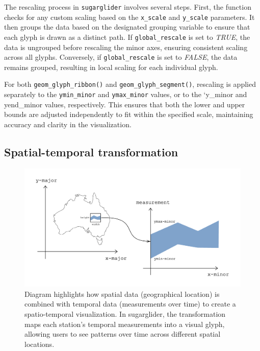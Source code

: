 The rescaling process in \texttt{sugarglider} involves several steps. First, the function checks for any custom scaling based on the \texttt{x\_scale} and \texttt{y\_scale} parameters. It then groups the data based on the designated grouping variable to ensure that each glyph is drawn as a distinct path. If \texttt{global\_rescale} is set to \emph{TRUE}, the data is ungrouped before rescaling the minor axes, ensuring consistent scaling across all glyphs. Conversely, if \texttt{global\_rescale} is set to \emph{FALSE}, the data remains grouped, resulting in local scaling for each individual glyph.

For both \texttt{geom\_glyph\_ribbon()} and \texttt{geom\_glyph\_segment()}, rescaling is applied separately to the \texttt{ymin\_minor} and \texttt{ymax\_minor} values, or to the `y\_minor and yend\_minor values, respectively. This ensures that both the lower and upper bounds are adjusted independently to fit within the specified scale, maintaining accuracy and clarity in the visualization.

\subsection{Spatial-temporal transformation}\label{spatial-temporal-transformation}

\begin{figure}
\includegraphics[width=17.71in]{figures/diagram-transformation} \caption{Diagram highlights how spatial data (geographical location) is combined with temporal data (measurements over time) to create a spatio-temporal visualization. In sugarglider, the transformation maps each station's temporal measurements into a visual glyph, allowing users to see patterns over time across different spatial locations.}\label{fig:unnamed-chunk-7}
\end{figure}

